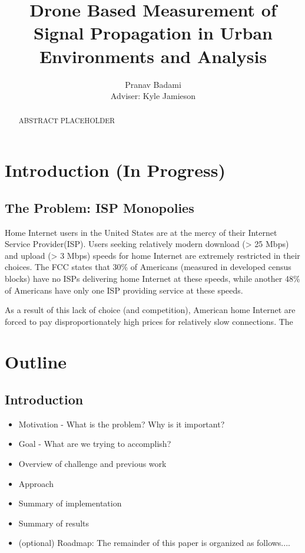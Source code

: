 \documentclass[pageno]{jpaper}
\begin{document}
\title{
Drone Based Measurement of Signal Propagation in Urban Environments and Analysis}

\author{Pranav Badami\\Adviser: Kyle Jamieson}

\date{}
\maketitle

\thispagestyle{empty}
\doublespacing

\begin{abstract}
ABSTRACT PLACEHOLDER
\end{abstract}

\section{Introduction (In Progress)}
\subsection{The Problem: ISP Monopolies}
Home Internet users in the United States are at the mercy of their Internet Service Provider(ISP). Users seeking relatively modern download (> 25 Mbps) and upload (> 3 Mbps) speeds for home Internet are extremely restricted in their choices. The FCC states that 30\% of Americans (measured in developed census blocks) have no ISPs delivering home Internet at these speeds, while another 48\% of Americans have only one ISP providing service at these speeds\cite{fcc15}. 

As a result of this lack of choice (and competition), American home Internet are forced to pay disproportionately high prices for relatively slow connections. The 
 
\section{Outline}  

\subsection{Introduction}
\begin{itemize}
	\item Motivation - What is the problem? Why is it important?
	\item Goal - What are we trying to accomplish?
	\item Overview of challenge and previous work 
	\item Approach 
	\item Summary of implementation
	\item Summary of results
	\item (optional) Roadmap: The remainder of this paper is organized as follows....
\end{itemize}
\end{document}
